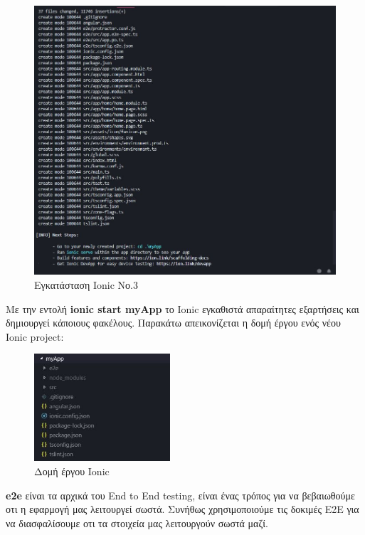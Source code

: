 \documentclass[a4paper,12pt]{article}
\begin{document}
				\begin{figure}[!htb]
					\begin{center}
						\caption{Εγκατάσταση Ionic Νο.3}
						\vspace*{0.5cm}
						\includegraphics[width=\linewidth]{ionic3} 
					\end{center}
				\end{figure}
				\clearpage

				Με την εντολή \textbf{ionic start myApp} το Ionic εγκαθιστά απαραίτητες εξαρτήσεις και δημιουργεί κάποιους φακέλους.
				Παρακάτω απεικονίζεται η δομή έργου ενός νέου Ionic project:
		
				\setlength\intextsep{0pt}
				\vspace*{1cm}
				\begin{figure}
					\caption{Δομή έργου Ionic}
					\vspace*{0.5cm}
					\includegraphics[width=0.45\textwidth]{ionic4}
					
				\end{figure}
					\textbf{e2e} είναι τα αρχικά του End to End testing, είναι ένας τρόπος για να βεβαιωθούμε οτι η εφαρμογή 
					 μας λειτουργεί σωστά. Συνήθως χρησιμοποιούμε τις δοκιμές E2E για να διασφαλίσουμε οτι τα στοιχεία μας
					 λειτουργούν σωστά μαζί.
\end{document}
